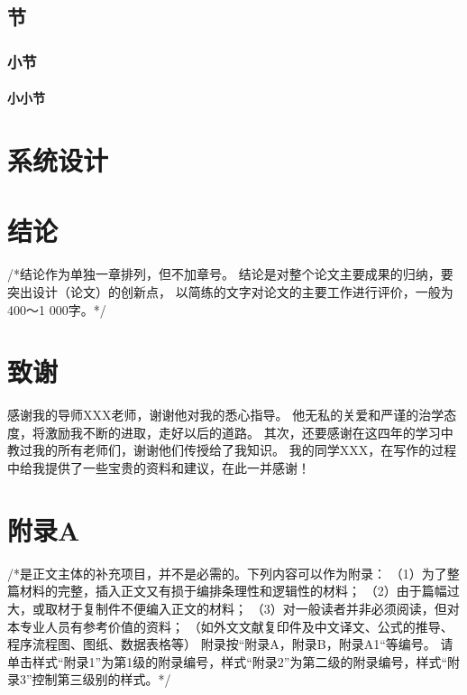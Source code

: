 \documentclass{jnuthesis}
\begin{document}
\section{节}

\subsection{小节}

\subsubsection{小小节}


\chapter{系统设计}

\appendix

\chapter*{结论}

/*结论作为单独一章排列，但不加章号。
结论是对整个论文主要成果的归纳，要突出设计（论文）的创新点，
以简练的文字对论文的主要工作进行评价，一般为400～1 000字。*/

\chapter*{致谢}

感谢我的导师XXX老师，谢谢他对我的悉心指导。
他无私的关爱和严谨的治学态度，将激励我不断的进取，走好以后的道路。
其次，还要感谢在这四年的学习中教过我的所有老师们，谢谢他们传授给了我知识。
我的同学XXX，在写作的过程中给我提供了一些宝贵的资料和建议，在此一并感谢！

\chapter*{附录A}

/*是正文主体的补充项目，并不是必需的。下列内容可以作为附录：
（1）为了整篇材料的完整，插入正文又有损于编排条理性和逻辑性的材料；
（2）由于篇幅过大，或取材于复制件不便编入正文的材料；
（3）对一般读者并非必须阅读，但对本专业人员有参考价值的资料；
（如外文文献复印件及中文译文、公式的推导、程序流程图、图纸、数据表格等）
附录按“附录A，附录B，附录A1“等编号。
请单击样式“附录1”为第1级的附录编号，样式“附录2”为第二级的附录编号，样式“附录3”控制第三级别的样式。*/
\end{document}
